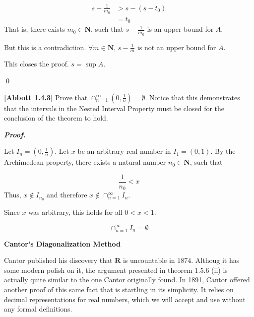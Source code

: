 \documentclass[10pt]{article}
\begin{document}
\begin{equation*}
\begin{aligned}
s-\frac{1}{m_{0}} &  >s-( s-t_{0})\\
 & =t_{0}
\end{aligned}
\end{equation*}
That is, there exists $\displaystyle m_{0} \in \mathbf{N}$, such that $\displaystyle s-\frac{1}{m_{0}}$ is an upper bound for $\displaystyle A$.



But this is a contradiction. $\displaystyle \forall m\in \mathbf{N}$, $\displaystyle s-\frac{1}{m}$ is not an upper bound for $\displaystyle A$.



This closes the proof. $\displaystyle s=\sup A$.

\qed 

\textbf{[Abbott 1.4.3]} Prove that $\displaystyle \cap _{n=1}^{\infty }\left( 0,\frac{1}{n}\right) =\emptyset $. Notice that this demonstrates that the intervals in the Nested Interval Property must be closed for the conclusion of the theorem to hold.



\textbf{\textit{Proof.}}

Let $\displaystyle I_{n} =\left( 0,\frac{1}{n}\right)$. Let $\displaystyle x$ be an arbitrary real number in $\displaystyle I_{1} =( 0,1)$. By the Archimedean property, there exists a natural number $\displaystyle n_{0} \in \mathbf{N}$, such that 


\begin{equation*}
\frac{1}{n_{0}} < x
\end{equation*}
Thus, $\displaystyle x\notin I_{n_{0}}$ and therefore $\displaystyle x\notin \cap _{n=1}^{\infty } I_{n}$. 

Since $\displaystyle x$ was arbitrary, this holds for all $\displaystyle 0< x< 1$. 


\begin{equation*}
\cap _{n=1}^{\infty } I_{n} =\emptyset 
\end{equation*}


\textbf{Cantor's Diagonalization Method}



Cantor published his discovery that $\displaystyle \mathbf{R}$ is uncountable in $\displaystyle 1874$. Althoug it has some modern polish on it, the argument presented in theorem 1.5.6 (ii) is actually quite similar to the one Cantor originally found. In 1891, Cantor offered another proof of this same fact that is startling in its simplicity. It relies on decimal representations for real numbers, which we will accept and use without any formal definitions.
\end{document}

